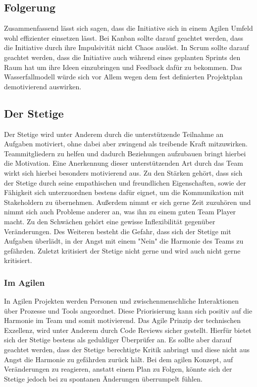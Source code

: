 \documentclass[twocolumn,10pt]{asme2ej}
\begin{document}
\subsection{Folgerung}
Zusammenfassend lässt sich sagen, dass die Initiative sich in einem Agilen Umfeld wohl effizienter einsetzen lässt. Bei Kanban sollte darauf geachtet werden, dass die Initiative durch ihre Impulsivität nicht Chaos auslöst. In Scrum sollte darauf geachtet werden, dass die Initiative auch während eines geplanten Sprints den Raum hat um ihre Ideen einzubringen und Feedback dafür zu bekommen. Das Wasserfallmodell würde sich vor Allem wegen dem fest definierten Projektplan demotivierend auswirken. 


\subsection{Der Stetige}
Der Stetige wird unter Anderem durch die unterstützende Teilnahme an Aufgaben motiviert, ohne dabei aber zwingend als treibende Kraft mitzuwirken. Teammitgliedern zu helfen und dadurch Beziehungen aufzubauen bringt hierbei die Motivation. Eine Anerkennung dieser unterstützenden Art durch das Team wirkt sich hierbei besonders motivierend aus. Zu den Stärken gehört, dass sich der Stetige durch seine empathischen und freundlichen Eigenschaften, sowie der Fähigkeit sich unterzuordnen bestens dafür eignet, um die Kommunikation mit Stakeholdern zu übernehmen. Außerdem nimmt er sich gerne Zeit zuzuhören und nimmt sich auch Probleme anderer an, was ihn zu einem guten Team Player macht. Zu den Schwächen gehört eine gewisse Inflexibilität gegenüber Veränderungen. Des Weiteren besteht die Gefahr, dass sich der Stetige mit Aufgaben überlädt, in der Angst mit einem "Nein" die Harmonie des Teams zu gefährden. Zuletzt kritisiert der Stetige nicht gerne und wird auch nicht gerne kritisiert.

\subsubsection{Im Agilen}
In Agilen Projekten werden Personen und zwischenmenschliche Interaktionen über Prozesse und Tools angeordnet. Diese Priorisierung kann sich positiv auf die Harmonie im Team und somit motivierend. Das Agile Prinzip der technischen Exzellenz, wird unter Anderem durch Code Reviews sicher gestellt. Hierfür bietet sich der Stetige bestens als geduldiger Überprüfer an. Es sollte aber darauf geachtet werden, dass der Stetige berechtigte Kritik anbringt und diese nicht aus Angst die Harmonie zu gefährden zurück hält. Bei dem agilen Konzept, auf Veränderungen zu reagieren, anstatt einem Plan zu Folgen, könnte sich der Stetige jedoch bei zu spontanen Änderungen überrumpelt fühlen.
\end{document}
